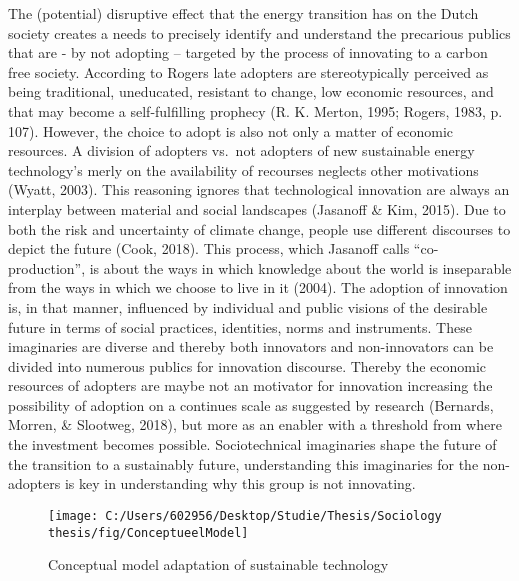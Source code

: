 \documentclass[man,floatsintext]{apa6}
\begin{document}
The (potential) disruptive effect that the energy transition has on the
Dutch society creates a needs to precisely identify and understand the
precarious publics that are - by not adopting -- targeted by the process
of innovating to a carbon free society. According to Rogers late
adopters are stereotypically perceived as being traditional, uneducated,
resistant to change, low economic resources, and that may become a
self-fulfilling prophecy (R. K. Merton, 1995; Rogers, 1983, p. 107).
However, the choice to adopt is also not only a matter of economic
resources. A division of adopters vs.~not adopters of new sustainable
energy technology's merly on the availability of recourses neglects
other motivations (Wyatt, 2003). This reasoning ignores that
technological innovation are always an interplay between material and
social landscapes (Jasanoff \& Kim, 2015). Due to both the risk and
uncertainty of climate change, people use different discourses to depict
the future (Cook, 2018). This process, which Jasanoff calls
\enquote{co-production}, is about the ways in which knowledge about the
world is inseparable from the ways in which we choose to live in it
(2004). The adoption of innovation is, in that manner, influenced by
individual and public visions of the desirable future in terms of social
practices, identities, norms and instruments. These imaginaries are
diverse and thereby both innovators and non-innovators can be divided
into numerous publics for innovation discourse. Thereby the economic
resources of adopters are maybe not an motivator for innovation
increasing the possibility of adoption on a continues scale as suggested
by research (Bernards, Morren, \& Slootweg, 2018), but more as an
enabler with a threshold from where the investment becomes possible.
Sociotechnical imaginaries shape the future of the transition to a
sustainably future, understanding this imaginaries for the non-adopters
is key in understanding why this group is not innovating.

\begin{figure}

{\centering \texttt{[image: C:/Users/602956/Desktop/Studie/Thesis/Sociology thesis/fig/ConceptueelModel]} 

}

\caption{Conceptual model adaptation of sustainable technology}\label{fig:Conspt}
\end{figure}
\end{document}
